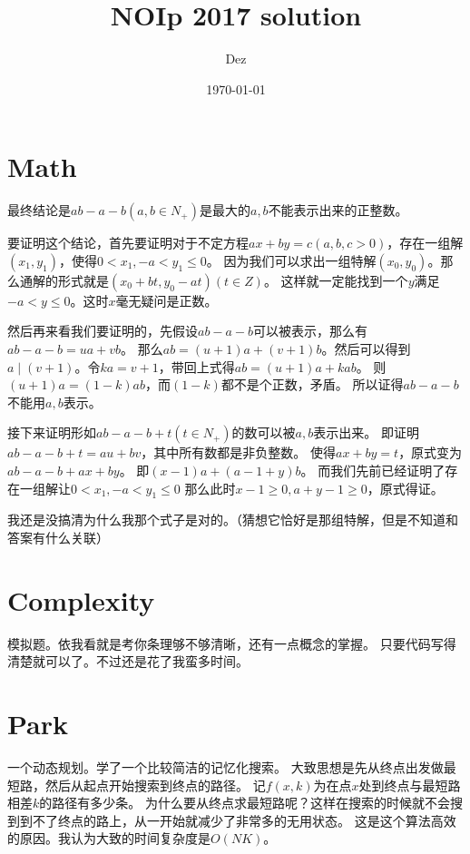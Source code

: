 \documentclass{article}
\title{NOIp 2017 solution}
\author{Dez}
\date{\today}
\begin{document}
\maketitle

\section{Math}
最终结论是$ab-a-b (a,b\in N_+)$是最大的$a,b$不能表示出来的正整数。

要证明这个结论，首先要证明对于不定方程$ax+by=c (a,b,c>0)$，存在一组解$(x_1,y_1)$，使得$0<x_1,-a<y_1\leq 0$。
因为我们可以求出一组特解$(x_0,y_0)$。那么通解的形式就是$(x_0+bt,y_0-at)(t\in Z)$。
这样就一定能找到一个$y$满足$-a<y\leq 0$。这时$x$毫无疑问是正数。

然后再来看我们要证明的，先假设$ab-a-b$可以被表示，那么有$ab-a-b=ua+vb$。\newline
那么$ab=(u+1)a+(v+1)b$。然后可以得到$a\mid (v+1)$。\newline 令$ka=v+1$，带回上式得$ab=(u+1)a+kab$。\newline
则$(u+1)a=(1-k)ab$，而$(1-k)$都不是个正数，矛盾。\newline
所以证得$ab-a-b$不能用$a,b$表示。

接下来证明形如$ab-a-b+t (t\in N_+)$的数可以被$a,b$表示出来。\newline
即证明$ab-a-b+t=au+bv$，其中所有数都是非负整数。\newline
使得$ax+by=t$，原式变为$ab-a-b+ax+by$。\newline
即$(x-1)a+(a-1+y)b$。\newline
而我们先前已经证明了存在一组解让$0<x_1,-a<y_1\leq 0$\newline
那么此时$x-1\geq 0,a+y-1\geq 0$，原式得证。

我还是没搞清为什么我那个式子是对的。（猜想它恰好是那组特解，但是不知道和答案有什么关联）

\section{Complexity}
模拟题。依我看就是考你条理够不够清晰，还有一点概念的掌握。
只要代码写得清楚就可以了。不过还是花了我蛮多时间。

\section{Park}
一个动态规划。学了一个比较简洁的记忆化搜索。
大致思想是先从终点出发做最短路，然后从起点开始搜索到终点的路径。
记$f(x,k)$为在点$x$处到终点与最短路相差$k$的路径有多少条。
为什么要从终点求最短路呢？这样在搜索的时候就不会搜到到不了终点的路上，从一开始就减少了非常多的无用状态。
这是这个算法高效的原因。我认为大致的时间复杂度是$O(NK)$。
\end{document}
